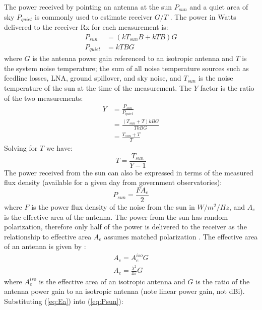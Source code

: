 \documentclass{article}
\begin{document}
The power received by pointing an antenna at the sun $P_{sun}$ and a quiet area of sky $P_{quiet}$ is commonly used to estimate receiver $G/T$ \cite{flagg2006_det_gt}.  The power in Watts delivered to the receiver Rx for each measurement is:
\begin{equation}
\begin{split}
P_{sun} &= (kT_{sun}B+kTB)G \\
P_{quiet} &= kTBG 
\end{split}
\end{equation}
where $G$ is the antenna power gain referenced to an isotropic antenna and $T$ is the system noise temperature; the sum of all noise temperature sources such as feedline losses, LNA, ground spillover, and sky noise, and $T_{sun}$ is the noise temperature of the sun at the time of the measurement. The $Y$ factor is the ratio of the two  measurements:
\begin{equation}
\begin{split}
Y &= \frac{P_{sun}}{P_{quiet}} \\
  &= \frac{(T_{sun}+T)kBG}{TkBG} \\
  &= \frac{T_{sun}+T}{T} 
\end{split}
\end{equation}
Solving for $T$ we have:
\begin{equation} \label{eq:T}
T = \frac{T_{sun}}{Y-1}
\end{equation}
The power received from the sun can also be expressed in terms of the measured flux density (available for a given day from government observatories):
\begin{equation} \label{eq:Psun}
P_{sun} = \frac{FA_e}{2}
\end{equation}
where $F$ is the power flux density of the noise from the sun in $W/m^2/Hz$, and $A_e$ is the effective area of the antenna. The power from the sun has random polarization, therefore only half of the power is delivered to the receiver as the relationship to effective area $A_e$ assumes matched polarization \cite[p 778]{kraus1988antennas}. The effective area of an antenna is given by \cite[Eq 2.3]{zavrel_antenna_physics}:
\begin{equation}
\begin{split} \label{eq:Ea}
A_e = A_e^{iso}G \\
A_e = \frac{\lambda^2}{4\pi}G
\end{split}
\end{equation}
where $A_e^{iso}$ is the effective area of an isotropic antenna and $G$ is the ratio of the antenna power gain to an isotropic antenna (note linear power gain, not dBi). Substituting (\ref{eq:Ea}) into (\ref{eq:Psun}):
\end{document}
